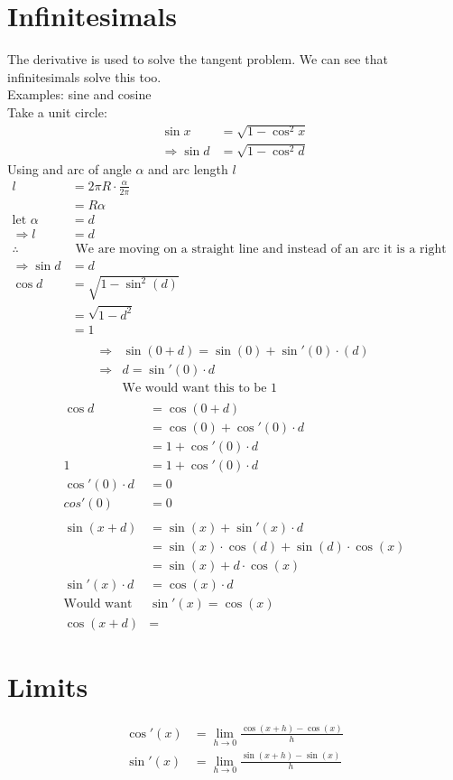 \documentclass[a4paper,12pt]{article}
\begin{document}
\section*{Infinitesimals}
The derivative is used to solve the tangent problem. We can see that infinitesimals solve this too. \\
Examples: sine and cosine \\
Take a unit circle:
\begin{align*}
\sin x & = \sqrt{1-\cos^2x} \\
\Rightarrow \sin d & = \sqrt{1-\cos^2d}
\end{align*}
Using and arc of angle $\alpha$ and arc length $l$
\begin{align*}
l & = 2 \pi R \cdot \frac{\alpha}{2 \pi} \\
& = R \alpha \\
\text{let } \alpha &= d \\
\Rightarrow l &= d \\
\therefore & \text{ We are moving on a straight line and instead of an arc it is a right angled triangle} \\
\Rightarrow \sin{d} & = d \\
\cos{d} & = \sqrt{1-\sin^2(d)} \\
& = \sqrt{1-d^2} \\
& = 1 \\
\end{align*}
\begin{align*}
\Rightarrow & \sin(0+d) = \sin(0) + \sin'(0) \cdot (d) \\
\Rightarrow & d = \sin'(0) \cdot d \\
&\text{We would want this to be 1} \\
\end{align*}
\begin{align*}
\cos{d} & = \cos(0+d) \\
& = \cos(0) + \cos'(0) \cdot d \\
& = 1 + \cos'(0) \cdot d \\
1 & = 1 + \cos'(0) \cdot d \\
\cos'(0) \cdot d & = 0 \\
cos'(0) &= 0 \\
\\
\sin(x + d)& = \sin(x) + \sin'(x) \cdot d \\
& = \sin(x) \cdot \cos(d) + \sin(d) \cdot \cos(x) \\
& = \sin(x) + d \cdot \cos(x) \\
\sin'(x) \cdot d & = \cos(x) \cdot d \\
\text{Would want } & \sin'(x) = \cos(x) \\
\cos(x+d) & = 
\end{align*}
\section*{Limits}
\begin{align*}
\cos'(x) & = \lim_{h \to 0} \frac{\cos(x+h) - \cos(x)}{h} \\
\sin'(x) & = \lim_{h \to 0} \frac{\sin(x+h) - \sin(x)}{h} \\
\end{align*}
\end{document}
